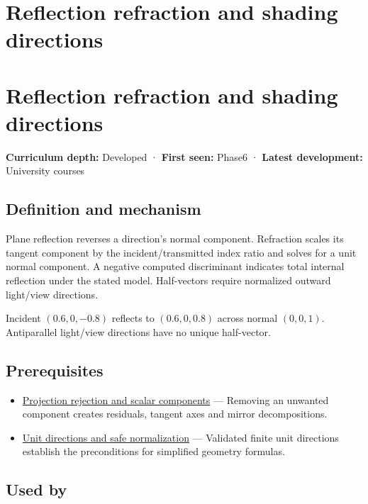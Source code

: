\hypertarget{appendix-44e00863b4d5}{}
\section*{Reflection refraction and shading directions}
\section{Reflection refraction and shading directions}\label{reflection-refraction-and-shading-directions}

\textbf{Curriculum depth:} Developed · \textbf{First seen:} Phase6 · \textbf{Latest development:} University courses

\subsection{Definition and mechanism}\label{definition-and-mechanism}

Plane reflection reverses a direction's normal component. Refraction scales its tangent component by the incident/transmitted index ratio and solves for a unit normal component. A negative computed discriminant indicates total internal reflection under the stated model. Half-vectors require normalized outward light/view directions.

Incident \((0.6,0,-0.8)\) reflects to \((0.6,0,0.8)\) across normal \((0,0,1)\). Antiparallel light/view directions have no unique half-vector.

\subsection{Prerequisites}\label{prerequisites}

\begin{itemize}
\tightlist
\item
  \hyperref[appendix-505a502c372a]{Projection rejection and scalar components} --- Removing an unwanted component creates residuals, tangent axes and mirror decompositions.
\item
  \hyperref[appendix-f744e41b95b4]{Unit directions and safe normalization} --- Validated finite unit directions establish the preconditions for simplified geometry formulas.
\end{itemize}

\subsection{Used by}\label{used-by}

